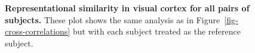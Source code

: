 \documentclass[10pt]{article}
\begin{document}
\begin{figure}[H]


\caption{\label{fig-cross-correlations-all}\textbf{Representational
similarity in visual cortex for all pairs of subjects.} These plot shows
the same analysis as in Figure~\ref{fig-cross-correlations} but with
each subject treated as the reference subject.}

\end{figure}%
\end{document}

